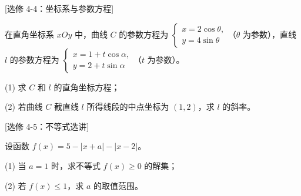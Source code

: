 \begin{question}
[选修 4-4：坐标系与参数方程]

在直角坐标系 $xOy$ 中，曲线 $C$ 的参数方程为 $\begin{cases}x=2\cos\theta,\\ y=4\sin\theta\end{cases}$（$\theta$ 为参数），直线 $l$ 的参数方程为 $\begin{cases}x=1+t\cos\alpha,\\ y=2+t\sin\alpha\end{cases}$（$t$ 为参数）。

(1) 求 $C$ 和 $l$ 的直角坐标方程；

(2) 若曲线 $C$ 截直线 $l$ 所得线段的中点坐标为 $(1,2)$，求 $l$ 的斜率。

\end{question}
\begin{question}
[选修 4-5：不等式选讲]

设函数 $f(x)=5-|x+a|-|x-2|$。

(1) 当 $a=1$ 时，求不等式 $f(x)\geqslant0$ 的解集；

(2) 若 $f(x)\leqslant1$，求 $a$ 的取值范围。

\end{question}